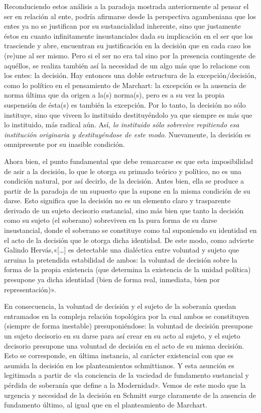 Reconduciendo estos análisis a la paradoja mostrada anteriormente al pensar el ser en relación al ente, podría afirmarse desde la perspectiva agambeniana que los entes ya no se justifican por su sustancialidad inherente, sino que justamente éstos en cuanto infinitamente insustanciales dada su implicación en el ser que los trasciende y abre, encuentran su justificación en la decisión que en cada caso los (re)une al ser mismo. Pero si el ser no era tal sino por la presencia contingente de aquéllos, se realiza también así la necesidad de un algo más que lo relacione con los entes: la decisión. Hay entonces una doble estructura de la excepción/decisión, como lo político en el pensamiento de Marchart: la excepción es la ausencia de norma última que da origen a la(s) norma(s), pero es a su vez la propia suspensión de ésta(s) es también la excepción. Por lo tanto, la decisión no sólo instituye, sino que viveen lo instituido destituyéndolo ya que siempre es más que lo instituido, más radical aún. Así,\emph{ lo instituido sólo sobrevive repitiendo esa institución originaria y destituyéndose de este modo}. Nuevamente, la decisión es omnipresente por su inasible condición.

Ahora bien, el punto fundamental que debe remarcarse es que esta imposibilidad de asir a la decisión, lo que le otorga su primado teórico y político, no es una condición natural, por así decirlo, de la decisión. Antes bien, ella se produce a partir de la paradoja de un supuesto que la supone en la misma condición de su darse. Esto significa que la decisión no es un elemento claro y trasparente derivado de un sujeto decisorio sustancial, sino más bien que tanto la decisión como su sujeto (el soberano) sobreviven en la pura forma de su darse insustancial, donde el soberano se constituye como tal suponiendo su identidad en el acto de la decisión que le otorga dicha identidad. De este modo, como advierte Galindo Hervás,«{[}\ldots{]} es detectable una dialéctica entre voluntad y sujeto que arruina la pretendida estabilidad de ambos: la voluntad de decisión sobre la forma de la propia existencia (que determina la existencia de la unidad política) presupone ya dicha identidad (bien de forma real, inmediata, bien por representación)».

En consecuencia, la voluntad de decisión y el sujeto de la soberanía quedan entramados en la compleja relación topológica por la cual ambos se constituyen (siempre de forma inestable) presuponiéndose: la voluntad de decisión presupone un sujeto decisorio en su darse para así crear en su acto al sujeto, y el sujeto decisorio presupone una voluntad de decisión en el acto de su misma decisión. Esto se corresponde, en última instancia, al carácter existencial con que es asumida la decisión en los planteamientos schmittianos. Y esta asunción es legitimada a partir de «la conciencia de la vaciedad de fundamento sustancial y pérdida de soberanía que define a la Modernidad». Vemos de este modo que la urgencia y necesidad de la decisión en Schmitt surge claramente de la ausencia de fundamento último, al igual que en el planteamiento de Marchart.

